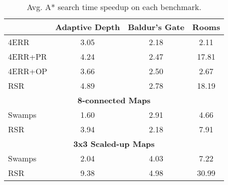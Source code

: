 \begin{table}[ht]
\begin{center}
\begin{tabular}{lccc}
  \hline
 & {\textbf{Adaptive Depth}} & {\textbf{Baldur's Gate}} & {\textbf{Rooms}} \\
  \hline
  4ERR & 3.05 & 2.18 &  2.11 \\ 
  4ERR+PR & 4.24 & 2.47 & 17.81 \\ 
  4ERR+OP & 3.66 &  2.50 & 2.67  \\ 
  RSR & 4.89 & 2.78 & 18.19  \\  
  \hline \hline
   \multicolumn{4}{c}{\textbf{8-connected Maps}} \\ 
	\hline 
  Swamps & 1.60 & 2.91 & 4.66 \\ 
  RSR & 3.94 & 2.18 & 7.91 \\ 
\hline \hline
 \multicolumn{4}{c}{\textbf{3x3 Scaled-up Maps}} \\ 
 \hline
  Swamps & 2.04 & 4.03 & 7.22 \\ 
  RSR & 9.38 & 4.98 & 30.99 \\ 
   \hline
\end{tabular}
\end{center}
\caption{Avg. A* search time speedup on each benchmark.} 
\label{table-results}
\end{table}

